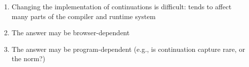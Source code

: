 \documentclass[8pt,pdf,handout]{beamer}
\begin{document}
\begin{frame}
\begin{columns}
\begin{column}{0.48\textwidth}
\begin{enumerate}
\item Changing the implementation of continuations is difficult: tends to
affect many parts of the compiler and runtime system

\item The answer may be browser-dependent

\item The answer may be program-dependent (e.g., is continuation capture
rare, or the norm?)

\end{enumerate}

\end{column}

\end{columns}

\end{frame}
\end{document}
